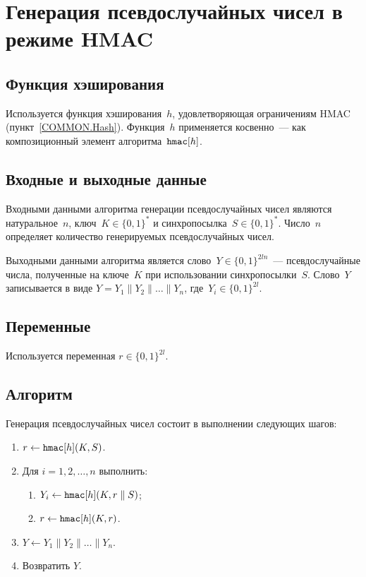 \section{Генерация псевдослучайных чисел в режиме HMAC}\label{PRNG-HMAC}

\subsection{Функция хэширования}

Используется функция хэширования~$h$,
удовлетворяющая ограничениям HMAC (пункт~\ref{COMMON.Hash}).
%
Функция~$h$ применяется косвенно~--- как композиционный элемент
алгоритма~$\texttt{hmac}[h]$.

\subsection{Входные и выходные данные}

Входными данными алгоритма генерации псевдослучайных чисел 
являются натуральное~$n$, ключ~$K\in\{0,1\}^*$ и синхропосылка~$S\in\{0,1\}^*$. 
Число~$n$ определяет количество генерируемых псевдослучайных чисел.

Выходными данными алгоритма является слово~$Y\in\{0,1\}^{2ln}$~---
псевдослучайные числа, полученные на ключе~$K$ при использовании
синхропосылки~$S$. 
Слово~$Y$ записывается в виде
$Y=Y_1\parallel Y_2\parallel\ldots\parallel Y_n$, 
где~$Y_i\in\{0,1\}^{2l}$.

\subsection{Переменные}

Используется переменная $r\in\{0,1\}^{2l}$.

\subsection{Алгоритм}

Генерация псевдослучайных чисел состоит в выполнении следующих шагов:
\begin{enumerate}
\item
$r\leftarrow\texttt{hmac}[h](K,S)$.
\item
Для $i=1,2,\ldots,n$ выполнить:
\begin{enumerate}
\item
$Y_i\leftarrow\texttt{hmac}[h](K, r\parallel S)$;
\item
$r\leftarrow \texttt{hmac}[h](K,r)$.
\end{enumerate}
\item
$Y\leftarrow Y_1\parallel Y_2\parallel\ldots\parallel Y_n$.
\item
Возвратить $Y$.
\end{enumerate}

